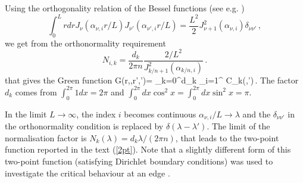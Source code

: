 \documentclass[preprint,aps]{revtex4}
\begin{document}
Using the orthogonality relation of the Bessel functions (see e.g. \cite{as})
$$
\int_0^L r dr J_\nu(\alpha_{\nu,i} r/L)J_{\nu'}(\alpha_{\nu',i} r/L)=
\frac{L^2}{2}J^2_{\nu+1}(\alpha_{\nu,i})\delta_{\nu\nu'}\,,
$$
we get from the orthonormality requirement
$$
N_{i,k}=\frac{d_k}{2\pi n}\frac{2/L^2}{J^2_{k/n+1}(\alpha_{k/n,i})}\,.
$$
that gives the Green function
\be
G(r,\theta,r',\theta')=
 \sum_{k=0}^\infty d_k \sum_{i=1}^\infty
{}
{\cal C}_k(\theta,\theta')\,.
\label{2ptL}
\ee
The factor $d_k$ comes from $\int_0^{2\pi} 1dx =2\pi$ and
$\int_0^{2\pi}dx  \cos^2  x= \int_0^{2\pi}dx  \sin^2  x  =\pi$.


In the limit $L\rightarrow\infty$, the index $i$ becomes
continuous $\alpha_{\nu,i}/L\rightarrow\lambda$ and the $\delta_{\nu\nu'}$
in the orthonormality condition is replaced by $\delta(\lambda-\lambda')$.
The limit of the normalisation factor is $N_k(\lambda)=d_k\lambda/(2\pi n)$,
that leads to the two-point function reported in the text (\ref{2pt}).
Note that a slightly different form of this two-point function
(satisfying Dirichlet boundary conditions) was used to investigate
the critical behaviour at an edge \cite{c-83}.
\end{document}
